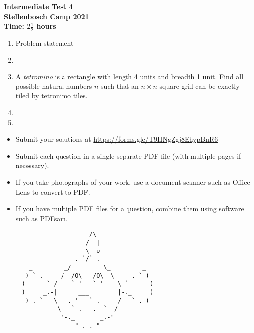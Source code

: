 \documentclass{article}
\begin{document}
\thispagestyle{empty}

\begin{center}
  \textbf{\Large Intermediate Test 4}
  \\ \vspace{1em}
  \textbf{\large Stellenbosch Camp 2021}
  \\ \vspace{1em}
  \textbf{\large Time: $2\frac{1}{2}$ hours}
\end{center}

\bigskip

\begin{enumerate}[itemsep=\fill]

\item %
Problem statement


\item %


\item%
A \textit{tetromino} is a rectangle with length 4 units and breadth 1 unit. Find all possible natural numbers $n$ such that an $n\times n$ square grid can be exactly tiled by tetronimo tiles.  



\item %


\item %

\end{enumerate}


\vfill
\begin{itemize}
	\item Submit your solutions at \href{https://forms.gle/T9HNgZgj8EhypBnR6}{https://forms.gle/T9HNgZgj8EhypBnR6}
	\item Submit each question in a single separate PDF file (with multiple pages if necessary).
	\item If you take photographs of your work, use a document scanner such as Office Lens to convert to PDF.
	\item If you have multiple PDF files for a question, combine them using software such as PDFsam.
\end{itemize}

\vfill
\centering
\small
\begin{BVerbatim}
                        /\
                       /  |
                       \  o
                   _.-`/`-._
       _         _/         \_         _
      ) `-._   _/  /O\   /O\  \_   _.-` (
     )      `-/    `-'   `-'    \-`      (
     )     _.-|      ___        |-._     (
      )_.-`   \   .-'   `-._    /   `-._(
               \   `-.___.--`  /
                "-._       _.-"
                    "-._.-"
\end{BVerbatim}
\end{document}
